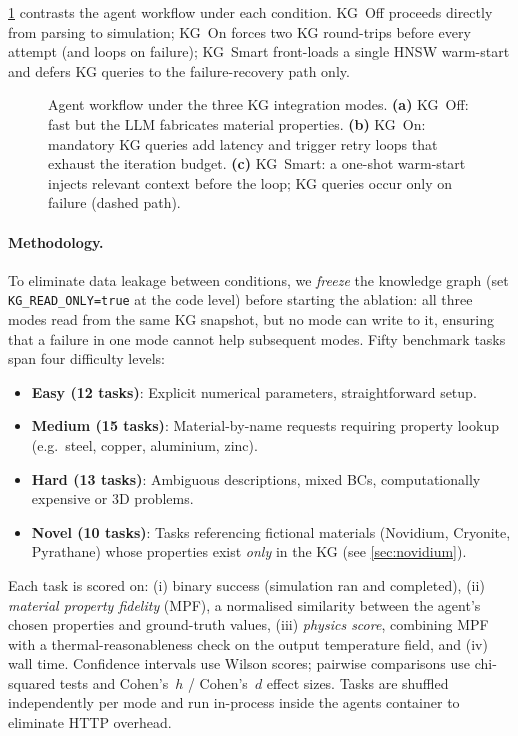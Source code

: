 \documentclass[twocolumn]{article}
\begin{document}
\cref{fig:kg-modes} contrasts the agent workflow under each condition.
KG~Off proceeds directly from parsing to simulation; KG~On forces two
KG round-trips before every attempt (and loops on failure); KG~Smart
front-loads a single HNSW warm-start and defers KG queries to the
failure-recovery path only.

\begin{figure}[htbp]
  \centering
  \resizebox{0.92\textwidth}{!}{}
  \caption{Agent workflow under the three KG integration modes.
    \textbf{(a)} KG~Off: fast but the LLM fabricates material properties.
    \textbf{(b)} KG~On: mandatory KG queries add latency and trigger
    retry loops that exhaust the iteration budget.
    \textbf{(c)} KG~Smart: a one-shot warm-start injects relevant context
    before the loop; KG queries occur only on failure (dashed path).}
  \label{fig:kg-modes}
\end{figure}

\paragraph{Methodology.}
To eliminate data leakage between conditions, we \emph{freeze} the
knowledge graph (set \texttt{KG\_READ\_ONLY=true} at the code level)
before starting the ablation: all three modes read from the same KG
snapshot, but no mode can write to it, ensuring that a failure in one
mode cannot help subsequent modes.
Fifty benchmark tasks span four difficulty levels:
\begin{itemize}
  \item \textbf{Easy (12 tasks)}: Explicit numerical parameters, straightforward setup.
  \item \textbf{Medium (15 tasks)}: Material-by-name requests requiring
        property lookup (e.g.\ steel, copper, aluminium, zinc).
  \item \textbf{Hard (13 tasks)}: Ambiguous descriptions, mixed BCs,
        computationally expensive or 3D problems.
  \item \textbf{Novel (10 tasks)}: Tasks referencing fictional materials
        (Novidium, Cryonite, Pyrathane) whose properties exist
        \emph{only} in the KG (see \cref{sec:novidium}).
\end{itemize}

Each task is scored on: (i) binary success (simulation ran and completed),
(ii) \emph{material property fidelity} (MPF), a normalised similarity
between the agent's chosen properties and ground-truth values, (iii)
\emph{physics score}, combining MPF with a thermal-reasonableness check
on the output temperature field, and (iv) wall time.  Confidence
intervals use Wilson scores; pairwise comparisons use chi-squared tests
and Cohen's~$h$ / Cohen's~$d$ effect sizes.
Tasks are shuffled independently per mode and run in-process inside the
agents container to eliminate HTTP overhead.
\end{document}
